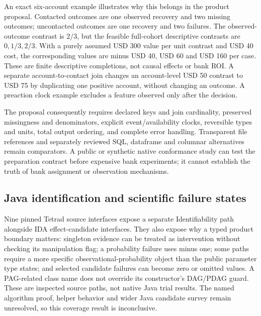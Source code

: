 An exact six-account example illustrates why this belongs in the product
proposal. Contacted outcomes are one observed recovery and two missing
outcomes; uncontacted outcomes are one recovery and two failures. The
observed-outcome contrast is \(2/3\), but the feasible full-cohort
descriptive contrasts are \(0,1/3,2/3\). With a purely assumed USD 300
value per unit contrast and USD 40 cost, the corresponding values are
minus USD 40, USD 60 and USD 160 per case. These are finite descriptive
completions, not causal effects or bank ROI. A separate
account-to-contact join changes an account-level USD 50 contrast to USD
75 by duplicating one positive account, without changing an outcome. A
preaction clock example excludes a feature observed only after the
decision. \citep{exec19_duckdb_reference}

The proposal consequently requires declared keys and join cardinality,
preserved missingness and denominators, explicit event/availability
clocks, reversible types and units, total output ordering, and complete
error handling. Transparent file references and separately reviewed SQL,
dataframe and columnar alternatives remain comparators. A public or
synthetic native conformance study can test the preparation contract
before expensive bank experiments; it cannot establish the truth of bank
assignment or observation mechanisms.

\hypertarget{java-identification-and-scientific-failure-states}{%
\subsection{Java identification and scientific failure
states}\label{java-identification-and-scientific-failure-states}}

Nine pinned Tetrad source interfaces expose a separate Identifiability
path alongside IDA effect-candidate interfaces. They also expose why a
typed product boundary matters: singleton evidence can be treated as
intervention without checking its manipulation flag; a probability
failure uses minus one; some paths require a more specific
observational-probability object than the public parameter type states;
and selected candidate failures can become zero or omitted values. A
PAG-related class name does not override its constructor's DAG/PDAG
guard. These are inspected source paths, not native Java trial results.
The named algorithm proof, helper behavior and wider Java candidate
survey remain unresolved, so this coverage result is inconclusive.
\citep{exec19_javaid_source}


